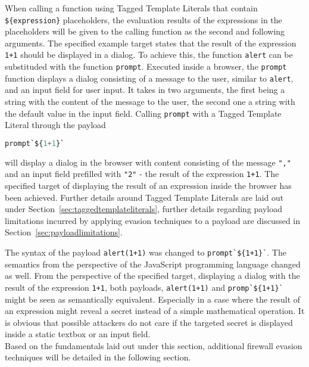 When calling a function using Tagged Template Literals that contain \verb|${expression}| placeholders, the evaluation results of the expressions in the placeholders will be given to the calling function as the second and following arguments.
The specified example target states that the result of the expression \verb|1+1| should be displayed in a dialog.
To achieve this, the function \verb|alert| can be substituded with the function \verb|prompt|. Executed inside a browser, the \verb|prompt| function displays a dialog consisting of a message to the user, similar to \verb|alert|, and an input field for user input. It takes in two arguments, the first being a string with the content of the message to the user, the second one a string with the default value in the input field. 
Calling \verb|prompt| with a Tagged Template Literal through the payload
\begin{lstlisting}[style=basicStyle, language=Python]
prompt`${1+1}`
\end{lstlisting}
will display a dialog in the browser with content consisting of the message \verb|","| and an input field prefilled with \verb|"2"| - the result of the expression \verb|1+1|. The specified target of displaying the result of an expression inside the browser has been achieved.
Further details around Tagged Template Literals are laid out under Section~\ref{sec:taggedtemplateliterals}, further details regarding payload limitations incurred by applying evasion techniques to a payload are discussed in Section~\ref{sec:payloadlimitations}. 
\cite{js/taggedtemplates,js/alert,js/prompt}

The syntax of the payload \verb|alert(1+1)| was changed to \verb|prompt`${1+1}`|. The semantics from the perspective of the JavaScript programming language changed as well. From the perspective of the specified target, displaying a dialog with the result of the expression \verb|1+1|, both payloads, \verb|alert(1+1)| and \verb|promp`${1+1}`| might be seen as semantically equivalent. Especially in a case where the result of an expression might reveal a secret instead of a simple mathematical operation. It is obvious that possible attackers do not care if the targeted secret is displayed inside a static textbox or an input field. \\

Based on the fundamentals laid out under this section, additional firewall evasion techniques will be detailed in the following section.

